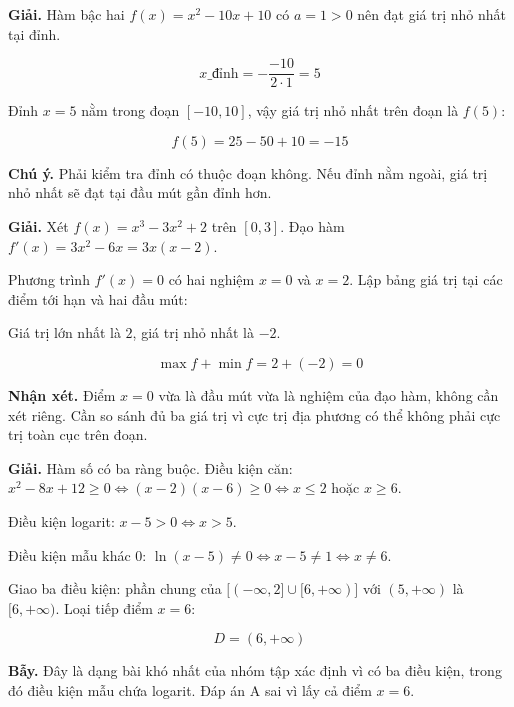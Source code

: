 \documentclass[11pt, a4paper]{article}
\begin{document}
\begin{dapan}[16 — Đáp án D]
\textbf{Giải.} Hàm bậc hai $f(x) = x^2 - 10x + 10$ có $a = 1 > 0$ nên đạt giá trị nhỏ nhất tại đỉnh.

$$x\_{\text{đỉnh}} = -\frac{-10}{2 \cdot 1} = 5$$

Đỉnh $x = 5$ nằm trong đoạn $[-10, 10]$, vậy giá trị nhỏ nhất trên đoạn là $f(5)$:

$$f(5) = 25 - 50 + 10 = -15$$

\textbf{Chú ý.} Phải kiểm tra đỉnh có thuộc đoạn không. Nếu đỉnh nằm ngoài, giá trị nhỏ nhất sẽ đạt tại đầu mút gần đỉnh hơn.
\end{dapan}

\begin{dapan}[17 — Đáp án A]
\textbf{Giải.} Xét $f(x) = x^3 - 3x^2 + 2$ trên $[0,3]$. Đạo hàm $f'(x) = 3x^2 - 6x = 3x(x-2)$.

Phương trình $f'(x) = 0$ có hai nghiệm $x = 0$ và $x = 2$. Lập bảng giá trị tại các điểm tới hạn và hai đầu mút:


Giá trị lớn nhất là $2$, giá trị nhỏ nhất là $-2$.

$$\max f + \min f = 2 + (-2) = 0$$

\textbf{Nhận xét.} Điểm $x = 0$ vừa là đầu mút vừa là nghiệm của đạo hàm, không cần xét riêng. Cần so sánh đủ ba giá trị vì cực trị địa phương có thể không phải cực trị toàn cục trên đoạn.
\end{dapan}

\begin{dapan}[18 — Đáp án D]
\textbf{Giải.} Hàm số có ba ràng buộc. Điều kiện căn: $x^2 - 8x + 12 \ge 0 \iff (x-2)(x-6) \ge 0 \iff x \le 2$ hoặc $x \ge 6$.

Điều kiện logarit: $x - 5 > 0 \iff x > 5$.

Điều kiện mẫu khác $0$: $\ln(x-5) \neq 0 \iff x - 5 \neq 1 \iff x \neq 6$.

Giao ba điều kiện: phần chung của $\big[(-\infty,2]\cup[6,+\infty)\big]$ với $(5,+\infty)$ là $[6,+\infty)$. Loại tiếp điểm $x = 6$:

$$D = (6, +\infty)$$

\textbf{Bẫy.} Đây là dạng bài khó nhất của nhóm tập xác định vì có ba điều kiện, trong đó điều kiện mẫu chứa logarit. Đáp án A sai vì lấy cả điểm $x = 6$.
\end{dapan}
\end{document}
